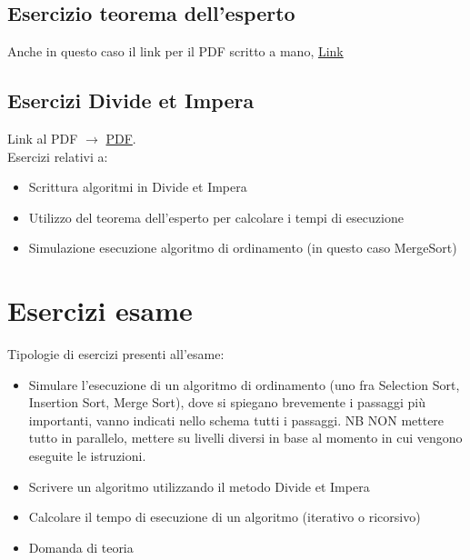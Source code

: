\subsection{Esercizio teorema dell'esperto}
Anche in questo caso il link per il PDF scritto a mano,
\href{https://drive.google.com/file/d/1aDfCN6H7dskDnQHP-jPJcsS9lYL16XWT/view?usp=sharing}{Link}
\subsection{Esercizi Divide et Impera}
Link al PDF $\rightarrow$
\href{https://drive.google.com/file/d/1uE9Qx0KQFS79spWmqmrkDph0iVdfbZnz/view?usp=sharing}{PDF}.\\
Esercizi relativi a:
\begin{itemize}
    \item Scrittura algoritmi in Divide et Impera
    \item Utilizzo del teorema dell'esperto per calcolare i tempi di esecuzione
    \item Simulazione esecuzione algoritmo di ordinamento (in questo caso MergeSort)
\end{itemize}
\section{Esercizi esame}
Tipologie di esercizi presenti all'esame:
\begin{itemize}
    \item Simulare l'esecuzione di un algoritmo di ordinamento (uno fra Selection Sort, 
    Insertion Sort, Merge Sort), dove si spiegano brevemente i passaggi più importanti,
    vanno indicati nello schema tutti i passaggi. NB NON mettere tutto in parallelo, mettere su livelli
    diversi in base al momento in cui vengono eseguite le istruzioni.
    \item Scrivere un algoritmo utilizzando il metodo Divide et Impera
    \item Calcolare il tempo di esecuzione di un algoritmo (iterativo o ricorsivo)
    \item Domanda di teoria
\end{itemize}


